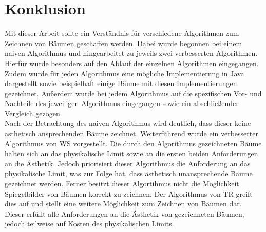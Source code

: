 \chapter{Konklusion}
\label{chap:kapitel5}
Mit dieser Arbeit sollte ein Verständnis für verschiedene Algorithmen zum Zeichnen von Bäumen geschaffen werden. Dabei wurde
begonnen bei einem naiven Algorithmus und hingearbeitet zu jeweils zwei verbesserten Algorithmen. Hierfür wurde besonders
auf den Ablauf der einzelnen Algorithmen eingegangen. Zudem wurde für jeden Algorithmus eine mögliche Implementierung in Java
dargestellt sowie beispielhaft einige Bäume mit diesen Implementierungen gezeichnet. Außerdem wurde bei jedem Algorithmus
auf die spezifischen Vor- und Nachteile des jeweiligen Algorithmus eingegangen sowie ein abschließender Vergleich gezogen.\\

Nach der Betrachtung des naiven Algorithmus wird deutlich, dass dieser keine ästhetisch ansprechenden Bäume zeichnet. Weiterführend wurde ein 
verbesserter Algorithmus von \ac{WS} vorgestellt. Die durch den Algorithmus gezeichneten Bäume halten sich an das physikalische Limit 
sowie an die ersten beiden Anforderungen an die Ästhetik. Jedoch priorisiert dieser Algorithmus die Anforderung an das physikalische
Limit, was zur Folge hat, dass ästhetisch unansprechende Bäume gezeichnet werden. Ferner besitzt dieser Algortihmus nicht die Möglichkeit
Spiegelbilder von Bäumen korrekt zu zeichnen. Der Algorithmus von \ac{TR} greift dies auf und stellt eine weitere Möglichkeit zum Zeichnen
von Bäumen dar. Dieser erfüllt alle Anforderungen an die Ästhetik von gezeichneten Bäumen, jedoch teilweise auf Kosten des 
physikalischen Limits. 


